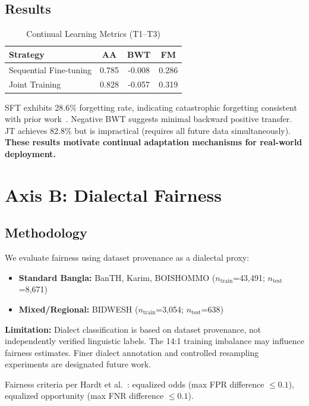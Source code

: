 \documentclass[conference]{IEEEtran}
\begin{document}
\subsection{Results}

\begin{table}[h]
\centering
\caption{Continual Learning Metrics (T1--T3)}
\label{tab:axisA}
\begin{tabular}{lccc}
\toprule
\textbf{Strategy} & \textbf{AA} & \textbf{BWT} & \textbf{FM} \\
\midrule
Sequential Fine-tuning & 0.785 & -0.008 & 0.286 \\
Joint Training & 0.828 & -0.057 & 0.319 \\
\bottomrule
\end{tabular}
\end{table}

SFT exhibits 28.6\% forgetting rate, indicating catastrophic forgetting consistent with prior work~\cite{qian2021lifelong}. Negative BWT suggests minimal backward positive transfer. JT achieves 82.8\% but is impractical (requires all future data simultaneously). \textbf{These results motivate continual adaptation mechanisms for real-world deployment.}

\section{Axis B: Dialectal Fairness}

\subsection{Methodology}

We evaluate fairness using dataset provenance as a dialectal proxy:
\begin{itemize}
\item \textbf{Standard Bangla:} BanTH, Karim, BOISHOMMO ($n_{\text{train}}$=43,491; $n_{\text{test}}$=8,671)
\item \textbf{Mixed/Regional:} BIDWESH ($n_{\text{train}}$=3,054; $n_{\text{test}}$=638)
\end{itemize}

\textbf{Limitation:} Dialect classification is based on dataset provenance, not independently verified linguistic labels. The 14:1 training imbalance may influence fairness estimates. Finer dialect annotation and controlled resampling experiments are designated future work.

Fairness criteria per Hardt et al.~\cite{hardt2016equality}: equalized odds (max FPR difference $\leq 0.1$), equalized opportunity (max FNR difference $\leq 0.1$).
\end{document}
